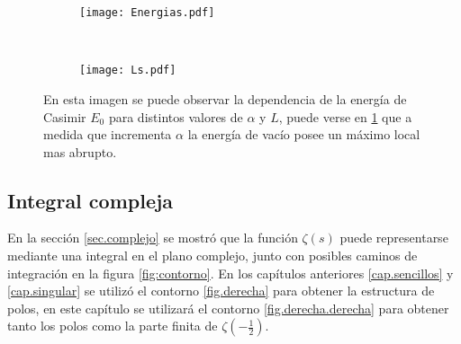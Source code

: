 \begin{figure*}[t!]
    \centering
    \begin{subfigure}[t]{0.5\textwidth}
        \centering
        \texttt{[image: Energias.pdf]}
        \caption{}
        \label{fig.izquierda123}
    \end{subfigure}%
    ~ 
    \begin{subfigure}[t]{0.5\textwidth}
        \centering
        \texttt{[image: Ls.pdf]}
        \caption{}
    \end{subfigure}
    \caption{En esta imagen se puede observar la dependencia de la energía de Casimir $E _0$ para distintos valores de $\alpha$ y $L$, puede verse en \ref{fig.izquierda123} que a medida que incrementa $\alpha$ la energía de vacío posee un máximo local mas abrupto.}
\label{fig:vacios}
\end{figure*}

\subsection{Integral compleja}\label{sec.finita.compleja}

En la sección \ref{sec.complejo} se mostró que la función $\zeta (s)$ puede representarse mediante una integral en el plano complejo, junto con posibles caminos de integración en la figura \ref{fig:contorno}. En los capítulos anteriores \ref{cap.sencillos}  y \ref{cap.singular} se utilizó el contorno \ref{fig.derecha} para obtener la estructura de polos, en este capítulo se utilizará el contorno \ref{fig.derecha.derecha} para obtener tanto los polos como la parte finita  de  $\zeta \left( - \frac{1}{2} \right)$.

